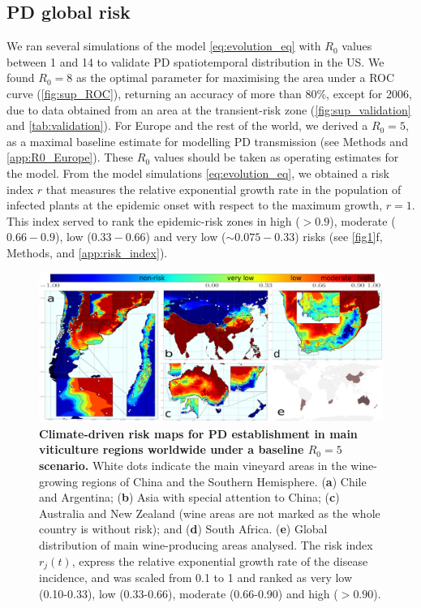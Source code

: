     \subsection{PD global risk}
    We ran several simulations of the model \cref{eq:evolution_eq} with $R_0$
    values between 1 and 14 to validate PD spatiotemporal distribution in the
    US. We found $R_0=8$ as the optimal parameter for maximising the area under
    a ROC curve (\cref{fig:sup_ROC}), returning an accuracy of more than
$80\%$, except for 2006, due to data obtained from an area at the
    transient-risk zone (\cref{fig:sup_validation} and \cref{tab:validation}).
    For Europe and the rest of the world, we derived a $R_0=5$, as a maximal
    baseline estimate for modelling PD transmission (see Methods and
    \cref{app:R0_Europe}). These $R_0$ values should be taken as operating
    estimates for the model.  From the model simulations
    \cref{eq:evolution_eq}, we obtained a risk index $r$ that measures the
    relative exponential growth rate in the population of infected plants
    at the epidemic onset with respect to the maximum growth, $r=1$. This index
    served to rank the epidemic-risk zones in high ($> 0.9$), moderate
    ($0.66-0.9$), low ($0.33-0.66$) and very low ($\sim 0.075-0.33$) risks (see
    \cref{fig1}f, Methods, and \cref{app:risk_index}).

    \begin{figure}[H]
        \centering
        \includegraphics[width=1\textwidth]{Figures/Fig3.pdf}
        \caption{\textbf{Climate-driven risk maps for PD establishment in main
                viticulture regions worldwide under a baseline $R_0 = 5$
                scenario.} White dots
            indicate the main vineyard areas in the wine-growing regions of
            China and the
            Southern Hemisphere. (\textbf{a}) Chile and Argentina; (\textbf{b})
            Asia with
            special attention to China; (\textbf{c}) Australia and New Zealand
            (wine areas
            are not marked as the whole country is without risk); and
            (\textbf{d}) South
            Africa. (\textbf{e}) Global distribution of main wine-producing
            areas analysed.
            The risk index $r_j(t)$, express the relative exponential growth
            rate of the
            disease incidence, and was scaled from 0.1 to 1 and ranked as very
            low
            (0.10-0.33), low (0.33-0.66), moderate (0.66-0.90) and high ($>
                0.90$).}
        \label{fig3}
    \end{figure}

